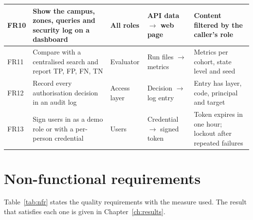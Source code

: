 \documentclass[12pt,a4paper,oneside]{report}
\begin{document}
{\begin{longtable}{|p{0.93cm}|p{3.75cm}|p{1.87cm}|p{3.19cm}|p{3.94cm}|}
FR10 & Show the campus, zones, queries and security log on a dashboard & All roles & API data $\rightarrow$ web page & Content filtered by the caller's role\\\hline
FR11 & Compare with a centralised search and report TP, FP, FN, TN & Evaluator & Run files $\rightarrow$ metrics & Metrics per cohort, state level and seed\\\hline
FR12 & Record every authorisation decision in an audit log & Access layer & Decision $\rightarrow$ log entry & Entry has layer, code, principal and target\\\hline
FR13 & Sign users in as a demo role or with a per-person credential & Users & Credential $\rightarrow$ signed token & Token expires in one hour; lockout after repeated failures\\\hline
\end{longtable}}


\section{Non-functional requirements}
Table~\ref{tab:nfr} states the quality requirements with the measure used. The result that satisfies each one is given in Chapter~\ref{ch:results}.
\end{document}
